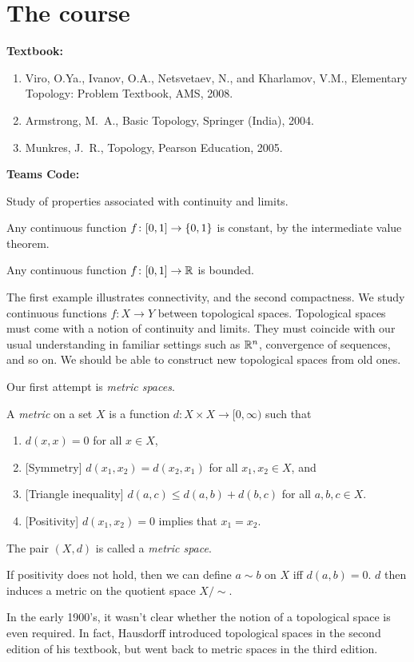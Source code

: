 \chapter*{The course}

\textbf{Textbook:}
\begin{enumerate}
    \item Viro, O.Ya., Ivanov, O.A., Netsvetaev, N., and Kharlamov, V.M., Elementary Topology: Problem Textbook, AMS, 2008.
    \item Armstrong, M.~A., Basic Topology, Springer (India), 2004.
    \item Munkres, J.~R., Topology, Pearson Education, 2005.
\end{enumerate}
\textbf{Teams Code:}

\begin{center}
    Study of properties associated with continuity and limits.
\end{center}
\begin{examples}
    \item Any continuous function $f\colon [0, 1] \to \{0, 1\}$ is
    constant, by the intermediate value theorem.
    \item Any continuous function $f\colon [0, 1] \to \mathbb{R}$ is bounded.
\end{examples}
The first example illustrates connectivity, and the second compactness.
We study continuous functions $f\colon X \to Y$ between topological spaces.
Topological spaces must come with a notion of continuity and limits.
They must coincide with our usual understanding in familiar settings such as
$\mathbb{R}^n$, convergence of sequences, and so on.
We should be able to construct new topological spaces from old ones.

Our first attempt is \emph{metric spaces}.
\begin{definition} \label{def:metric-space}
    A \emph{metric} on a set $X$ is a function
    $d\colon X \times X \to [0, \infty)$
    such that
    \begin{enumerate}
        \item $d(x, x) = 0$ for all $x \in X$,
        \item{} [Symmetry] $d(x_1, x_2) = d(x_2, x_1)$ for all
            $x_1, x_2 \in X$, and
        \item{} [Triangle inequality]
            $d(a, c) \le d(a, b) + d(b, c)$ for all $a, b, c \in X$.
        \item{} [Positivity] $d(x_1, x_2) = 0$ implies that
            $x_1 = x_2$.
    \end{enumerate}
    The pair $(X, d)$ is called a \emph{metric space}.
\end{definition}
\begin{remark}
    If positivity does not hold, then we can define $a \sim b$ on $X$ iff
    $d(a, b) = 0$.
    $d$ then induces a metric on the quotient space $X/{\sim}$.
\end{remark}
In the early 1900's, it wasn't clear whether the notion of a topological
space is even required.
In fact, Hausdorff introduced topological spaces in the second edition of
his textbook, but went back to metric spaces in the third edition.

